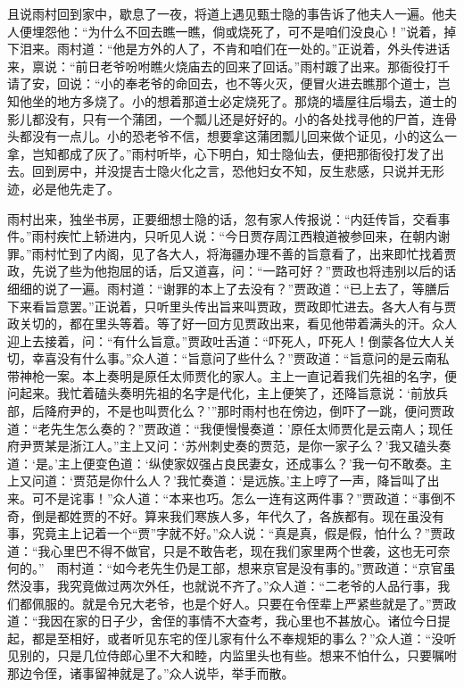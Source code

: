 \begin{parag}
    且说雨村回到家中，歇息了一夜，将道上遇见甄士隐的事告诉了他夫人一遍。他夫人便埋怨他：“为什么不回去瞧一瞧，倘或烧死了，可不是咱们没良心！”说着，掉下泪来。雨村道：“他是方外的人了，不肯和咱们在一处的。”正说着，外头传进话来，禀说：“前日老爷吩咐瞧火烧庙去的回来了回话。”雨村踱了出来。那衙役打千请了安，回说：“小的奉老爷的命回去，也不等火灭，便冒火进去瞧那个道士，岂知他坐的地方多烧了。小的想着那道士必定烧死了。那烧的墙屋往后塌去，道士的影儿都没有，只有一个蒲团，一个瓢儿还是好好的。小的各处找寻他的尸首，连骨头都没有一点儿。小的恐老爷不信，想要拿这蒲团瓢儿回来做个证见，小的这么一拿，岂知都成了灰了。”雨村听毕，心下明白，知士隐仙去，便把那衙役打发了出去。回到房中，并没提吉士隐火化之言，恐他妇女不知，反生悲感，只说并无形迹，必是他先走了。
\end{parag}


\begin{parag}
    雨村出来，独坐书房，正要细想士隐的话，忽有家人传报说：“内廷传旨，交看事件。”雨村疾忙上轿进内，只听见人说：“今日贾存周江西粮道被参回来，在朝内谢罪。”雨村忙到了内阁，见了各大人，将海疆办理不善的旨意看了，出来即忙找着贾政，先说了些为他抱屈的话，后又道喜，问：“一路可好？”贾政也将违别以后的话细细的说了一遍。雨村道：“谢罪的本上了去没有？”贾政道：“已上去了，等膳后下来看旨意罢。”正说着，只听里头传出旨来叫贾政，贾政即忙进去。各大人有与贾政关切的，都在里头等着。等了好一回方见贾政出来，看见他带着满头的汗。众人迎上去接着，问：“有什么旨意。”贾政吐舌道：“吓死人，吓死人！倒蒙各位大人关切，幸喜没有什么事。”众人道：“旨意问了些什么？”贾政道：“旨意问的是云南私带神枪一案。本上奏明是原任太师贾化的家人。主上一直记着我们先祖的名字，便问起来。我忙着磕头奏明先祖的名字是代化，主上便笑了，还降旨意说：‘前放兵部，后降府尹的，不是也叫贾化么？’”那时雨村也在傍边，倒吓了一跳，便问贾政道：“老先生怎么奏的？”贾政道：“我便慢慢奏道：’原任太师贾化是云南人；现任府尹贾某是浙江人。”主上又问：‘苏州刺史奏的贾范，是你一家子么？’我又磕头奏道：‘是。’主上便变色道：‘纵使家奴强占良民妻女，还成事么？’我一句不敢奏。主上又问道：‘贾范是你什么人？’我忙奏道：‘是远族。’主上哼了一声，降旨叫了出来。可不是诧事！”众人道：“本来也巧。怎么一连有这两件事？”贾政道：“事倒不奇，倒是都姓贾的不好。算来我们寒族人多，年代久了，各族都有。现在虽没有事，究竟主上记着一个“贾”字就不好。”众人说：“真是真，假是假，怕什么？”贾政道：“我心里巴不得不做官，只是不敢告老，现在我们家里两个世袭，这也无可奈何的。”　雨村道：“如今老先生仍是工部，想来京官是没有事的。”贾政道：“京官虽然没事，我究竟做过两次外任，也就说不齐了。”众人道：“二老爷的人品行事，我们都佩服的。就是令兄大老爷，也是个好人。只要在令侄辈上严紧些就是了。”贾政道：“我因在家的日子少，舍侄的事情不大查考，我心里也不甚放心。诸位今日提起，都是至相好，或者听见东宅的侄儿家有什么不奉规矩的事么？”众人道：“没听见别的，只是几位侍郎心里不大和睦，内监里头也有些。想来不怕什么，只要嘱咐那边令侄，诸事留神就是了。”众人说毕，举手而散。
\end{parag}


